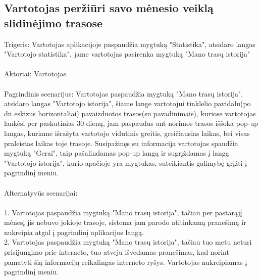 \documentclass[oneside]{VUMIFPSkursinis}
\begin{document}
\subsection{Vartotojas peržiūri savo mėnesio veiklą slidinėjimo trasose}
Trigeris: Vartotojas aplikacijoje paspaudžia mygtuką "Statistika", atsidaro langas "Vartotojo statistika", jame vartotojas pasirenka mygtuką "Mano trasų istorija" \\ \\
Aktoriai: Vartotojas \\ \\
Pagrindinis scenarijus: Vartotojas paspaudžia mygtuką "Mano trasų istorija", atsidaro langas "Vartotojo istorija", šiame lange vartotojui tinklelio pavidalu(po du eskizus horizontaliai) pavaizduotos trasos(su pavadinimais), kuriose vartotojas lankėsi per paskutinias 30 dienų, jam paspaudus ant norimos trasos iššoka pop-up langas, kuriame išrašyta vartotojo vidutinis greitis, greičiausias laikas, bei visas praleistas laikas toje trasoje. Susipažinęs su informacija vartotojas spaudžia mygtuką "Gerai", taip pašalindamas pop-up langą ir sugrįždamas į  langą "Vartotojo istorija", kurio apačioje yra mygtukas, suteikiantis galimybę grįžti į pagrindinį meniu. \\ \\
Alternatyvūs scenarijai: \\ \\
1. Vartotojas paspaudžia mygtuką "Mano trasų istorija", tačiau per pastarąjį mėnesį jis nebuvo jokioje trasoje, sistema jam parodo atitinkamą pranešimą ir nukreipia atgal į pagrindinį aplikacijos langą. \\
2. Vartotojas paspaudžia mygtuką "Mano trasų istorija", tačiau tuo metu neturi prisijungimo prie interneto, tuo atveju išvedamas pranešimas, kad norint pamatyti šią informaciją reikalingas interneto ryšys. Vartotojas nukreipiamas į pagrindinį meniu. \\
\end{document}
